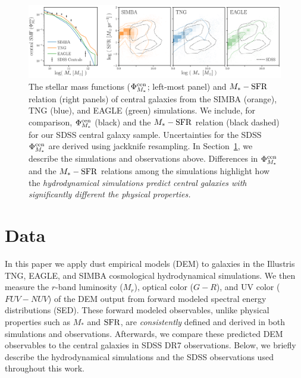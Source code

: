 \begin{figure}
\begin{center}
    \includegraphics[width=\textwidth]{figs/smf_m_sfr.pdf}
    \caption{\label{fig:smf_msfr}
    The stellar mass functions ($\Phi^{\rm cen}_{M_*}$; left-most panel) and
    $M_*-{\rm SFR}$ relation (right panels) of central galaxies from the SIMBA
    (orange), TNG (blue), and EAGLE (green) simulations. We include, for
    comparison, $\Phi^{\rm cen}_{M_*}$ (black) and the $M_*-{\rm SFR}$ relation
    (black dashed) for our SDSS central galaxy sample. Uncertainties for 
    the SDSS $\Phi^{\rm cen}_{M_*}$ are derived using jackknife resampling. 
    In Section~\ref{sec:sims}, we describe the simulations and observations 
    above. Differences in $\Phi^{\rm cen}_{M_*}$ and the $M_*-{\rm SFR}$ relations 
    among the simulations highlight how the \emph{hydrodynamical simulations 
    predict central galaxies with significantly different the physical properties.}
    }
\end{center}
\end{figure}

\section{Data}\label{sec:sims}
In this paper we apply dust empirical models (DEM) to galaxies in the Illustris TNG,
EAGLE, and SIMBA cosmological hydrodynamical simulations. We then measure the
$r$-band luminosity ($M_r$), optical color ($G-R$), and UV color ($FUV-NUV$) of
the DEM output from forward modeled spectral energy distributions (SED). These 
forward modeled observables, unlike physical properties such as $M_*$ and
${\rm SFR}$, are \emph{consistently} defined and derived in both simulations and
observations. Afterwards, we compare these predicted DEM observables to the 
central galaxies in SDSS DR7 observations. Below, we briefly describe the 
hydrodynamical simulations and the SDSS observations used throughout this
work.

